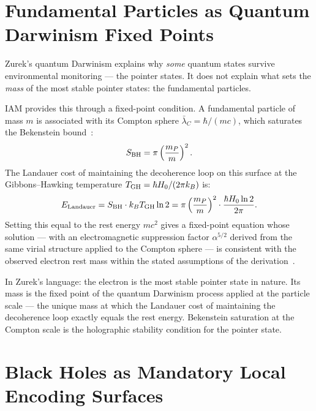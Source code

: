 \documentclass[12pt,a4paper]{article}
\begin{document}
\section{Fundamental Particles as Quantum Darwinism Fixed Points}
\label{sec:electron}

Zurek's quantum Darwinism explains why \emph{some} quantum states survive
environmental monitoring --- the pointer states. It does not explain what sets
the \emph{mass} of the most stable pointer states: the fundamental particles.

IAM provides this through a fixed-point condition. A fundamental particle of
mass $m$ is associated with its Compton sphere $\bar\lambda_C = \hbar/(mc)$,
which saturates the Bekenstein bound~\citep{Bekenstein1973}:
\begin{equation}
S_{\rm BH} = \pi\left(\frac{m_P}{m}\right)^2.
\label{eq:bekenstein}
\end{equation}
The Landauer cost of maintaining the decoherence loop on this surface at the
Gibbons--Hawking temperature $T_{\rm GH} = \hbar H_0/(2\pi k_B)$ is:
\begin{equation}
E_{\rm Landauer} = S_{\rm BH} \cdot k_B T_{\rm GH} \ln 2
= \pi \left(\frac{m_P}{m}\right)^2 \cdot \frac{\hbar H_0 \ln 2}{2\pi}.
\label{eq:E_landauer}
\end{equation}
Setting this equal to the rest energy $mc^2$ gives a fixed-point equation
whose solution --- with an electromagnetic suppression factor $\alpha^{5/2}$
derived from the same virial structure applied to the Compton sphere ---
is consistent with the observed electron rest mass within the stated
assumptions of the derivation~\citep{IAM_electron}.

In Zurek's language: the electron is the most stable pointer state in nature.
Its mass is the fixed point of the quantum Darwinism process applied at the
particle scale --- the unique mass at which the Landauer cost of maintaining
the decoherence loop exactly equals the rest energy. Bekenstein saturation at
the Compton scale is the holographic stability condition for the pointer state.

\section{Black Holes as Mandatory Local Encoding Surfaces}
\label{sec:bh}
\end{document}
